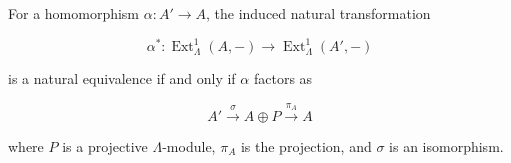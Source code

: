 For a homomorphism $\alpha : A' \rightarrow A$, the induced natural transformation

$$\alpha^* : \operatorname{Ext}_\Lambda^1(A, -) \rightarrow \operatorname{Ext}_\Lambda^1(A', -)$$

is a natural equivalence if and only if $\alpha$ factors as

$$A' \xrightarrow{\sigma} A \oplus P \xrightarrow{\pi_A} A$$

where $P$ is a projective $\Lambda$-module, $\pi_A$ is the projection, and $\sigma$ is an isomorphism.

